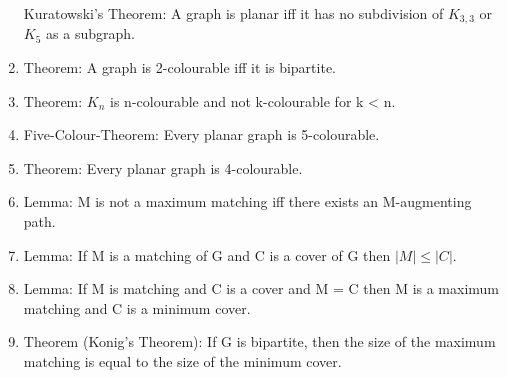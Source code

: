\documentclass[]{article}
\begin{document}
\begin{enumerate}
  Kuratowski's Theorem: A graph is planar iff it has no subdivision of
  $K_{3,3}$ or $K_5$ as a subgraph.
\item
  Theorem: A graph is 2-colourable iff it is bipartite.
\item
  Theorem: $K_n$ is n-colourable and not k-colourable for k \textless{}
  n.
\item
  Five-Colour-Theorem: Every planar graph is 5-colourable.
\item
  Theorem: Every planar graph is 4-colourable.
\item
  Lemma: M is not a maximum matching iff there exists an M-augmenting
  path.
\item
  Lemma: If M is a matching of G and C is a cover of G then
  $|M| \leq |C|$.
\item
  Lemma: If M is matching and C is a cover and \textbar{}M\textbar{} =
  \textbar{}C\textbar{} then M is a maximum matching and C is a minimum
  cover.
\item
  Theorem (Konig's Theorem): If G is bipartite, then the size of the
  maximum matching is equal to the size of the minimum cover.
\end{enumerate}
\end{document}
